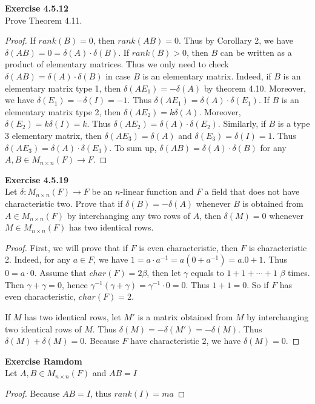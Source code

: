 \documentclass[12pt, a4paper]{article}
\theoremstyle{plain}
\newenvironment{exercise}[2][Exercise]
    { \begin{mdframed}[backgroundcolor=gray!20] \textbf{#1 #2} \\}
    {  \end{mdframed}}
\begin{document}
\begin{exercise}{4.5.12}
Prove Theorem 4.11. 
\end{exercise}
	\begin{proof}
	If $rank(B)=0$, then $rank(AB)=0$. Thus by Corollary 2, we have $\delta(AB)=0=\delta(A)\cdot\delta(B)$. If $rank(B)>0$, then $B$ can be written as a product of elementary matrices. Thus we only need to check $\delta(AB)=\delta(A)\cdot\delta(B)$ in case $B$ is an elementary matrix. Indeed, if $B$ is an elementary matrix type 1, then $\delta(AE_1)=-\delta(A)$ by theorem 4.10. Moreover, we have $\delta(E_1)=-\delta(I)=-1$. Thus $\delta(AE_1)=\delta(A)\cdot\delta(E_1)$. If $B$ is an elementary matrix type 2, then $\delta(AE_2)=k\delta(A)$. Moreover, $\delta(E_2)=k\delta(I)=k$. Thus $\delta(AE_2)=\delta(A)\cdot\delta(E_2)$. Similarly, if $B$ is a type 3 elementary matrix, then $\delta(AE_3)=\delta(A)$ and $\delta(E_3)=\delta(I)=1$. Thus $\delta(AE_3)=\delta(A)\cdot\delta(E_3)$. To sum up, $\delta(AB)=\delta(A)\cdot\delta(B)$ for any $A,B\in M_{n\times n}(F)\rightarrow F$.
	\end{proof}
	
\begin{exercise}{4.5.19}
Let $\delta:M_{n\times n}(F)\rightarrow F$ be an $n$-linear function and $F$ a field that does not have characteristic two. Prove that if $\delta(B)=-\delta(A)$ whenever $B$ is obtained from $A\in M_{n\times n}(F)$ by interchanging any two rows of $A$, then $\delta(M)=0$ whenever $M\in M_{n\times n}(F)$ has two identical rows.
\end{exercise}
	\begin{proof}
	First, we will prove that if $F$ is even characteristic, then $F$ is characteristic 2. Indeed, for any $a\in F$, we have $1=a\cdot a^{-1}=a(0+a^{-1})=a.0+1$. Thus $0=a\cdot 0$. Assume that $char(F)=2\beta$, then let $\gamma$ equals to $1+1+\cdots +1$ $\beta$ times. Then $\gamma + \gamma =0$, hence $\gamma^{-1}(\gamma+\gamma)=\gamma^{-1}\cdot 0=0$. Thus $1+1=0$. So if $F$ has even characteristic, $char(F)=2$.
	
	If $M$ has two identical rows, let $M'$ is a matrix obtained from $M$ by interchanging two identical rows of $M$. Thus $\delta(M)=-\delta(M')=-\delta(M)$. Thus $\delta(M)+\delta(M)=0$. Because $F$ have characteristic 2, we have $\delta(M)=0$.
	\end{proof}

\begin{exercise}{Ramdom}
Let $A,B\in M_{n\times n}(F)$ and $AB=I$
\end{exercise}
\begin{proof}
Because $AB=I$, thus $rank(I)=ma$
\end{proof}
\end{document}
